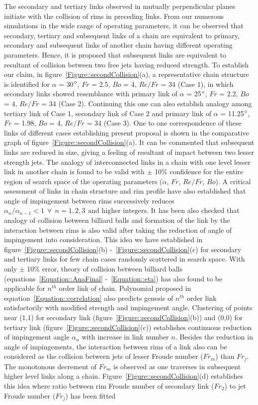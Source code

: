 \documentclass{jfm}
\begin{document}
The secondary and tertiary links observed in mutually perpendicular planes initiate with the collision of rims in preceding links. From our numerous simulations in the wide range of operating parameters, it can be observed that secondary, tertiary and subsequent links of a chain are equivalent to primary, secondary and subsequent links of another chain having different operating parameters. Hence, it is proposed that subsequent links are equivalent to resultant of collision between two free jets having reduced strength. To establish our claim, in figure~\ref{Figure::secondCollision}(a), a representative chain structure is identified for $\alpha$ = 30$\degree$, $Fr$ = 2.5, $Bo$ = 4, $Re/Fr$ = 34 (Case 1), in which secondary links showed resemblance with primary link of $\alpha$ = 25$\degree$, $Fr$ = 2.2, $Bo$ = 4, $Re/Fr$ = 34 (Case 2). Continuing this one can also establish analogy among tertiary link of Case 1, secondary link of Case 2 and primary link of $\alpha$ = 11.25$\degree$, $Fr$ = 1.98, $Bo$ = 4, $Re/Fr$ = 34 (Case 3). One to one correspondence of these links of different cases establishing present proposal is shown in the comparative graph of figure~\ref{Figure::secondCollision}(a). It can be commented that subsequent links are reduced in size, giving a feeling of resultant of impact between two lesser strength jets. The analogy of interconnected links in a chain with one level lesser link in another chain is found to be valid with $\pm$ 10\% confidence for the entire region of search space of the operating parameters ($\alpha$, $Fr$, $Re/Fr$, $Bo$). A critical assessment of links in chain structure and rim profile have also established that angle of impingement between rims successively reduces $\alpha_{n}/\alpha_{n-1} < 1 \:\:\forall\:\: n = 1, 2, 3 \:\:\text{and higher integers}$. It has been also checked that analogy of collision between billiard balls and formation of the link by the interaction between rims is also valid after taking the reduction of angle of impingement into consideration. This idea we have established in figure~\ref{Figure::secondCollision}(b) -~\ref{Figure::secondCollision}(c) for secondary and tertiary links for few chain cases randomly scattered in search space. With only $\pm$ 10\% error, theory of collision between billiard balls (equations~\ref{Equation::AnaFinal} -~\ref{Equation::eta}) has also found to be applicable for $n^{th}$ order link of chain. Polynomial proposed in equation~\ref{Equation::correlation} also predicts genesis of $n^{th}$ order link satisfactorily with modified strength and impingement angle. Clustering of points near (1,1) for secondary link (figure~\ref{Figure::secondCollision}(b)) and (0,0) for tertiary link (figure~\ref{Figure::secondCollision}(c)) establishes continuous reduction of impingement angle $\alpha_{n}$ with increase in link number $n$. Besides the reduction in angle of impingements, the interaction between rims of a link also can be considered as the collision between jets of lesser Froude number ($Fr_m$) than $Fr_j$. The monotonous decrement of $Fr_m$ is observed as one traverses in subsequent higher level links along a chain. Figure~\ref{Figure::secondCollision}(d) establishes this idea where ratio between rim Froude number of secondary link ($Fr_2$) to jet Froude number ($Fr_j$) has been fitted 
\end{document}
